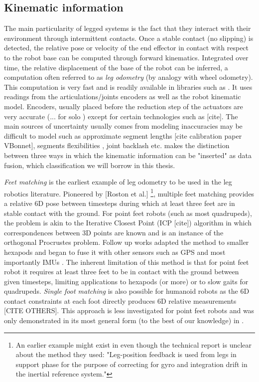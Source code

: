 \subsection{Kinematic information}
The main particularity of legged systems is the fact that they interact with their environment through intermittent contacts.
Once a stable contact (no slipping) is detected, the relative pose or velocity of the end effector in contact with respect to the robot base 
can be computed through forward kinematics. Integrated over time, the relative displacement of the base of the robot can be inferred, a computation 
often referred to as \textit{leg odometry} (by analogy with wheel odometry). This computation is very fast and is readily available in libraries such as \cite{carpentier2019pinocchio, hereid2017frost}. It uses
readings from the articulations/joints encoders as well as the robot kinematic model. Encoders, usually placed before the reduction step of the actuators
are very accurate (... for solo \cite{grimminger2020open}) except for certain technologies such as [cite]. The main sources of uncertainty usually comes from
modeling inaccuracies may be difficult to model such as approximate segment lengths [cite calibration paper VBonnet], segments flexibilities \cite{vigne2018estimation}, 
joint backlash \cite{fallon2014drift} etc. \cite{bloesch2018technical} makes the distinction between three ways in which the kinematic information can be "inserted" as data fusion, 
which classification we will borrow in this thesis. 


\textit{Feet matching} is the earliest example of leg odometry to be used in the leg robotics literature. Pioneered by [Roston et al.] 
\footnote{An earlier example might exist in \cite{roston1991dead} even though the technical report is unclear about the method they used: 
"Leg-position feedback is used from legs in support phase for the purpose of correcting for gyro and integration drift in the inertial reference system."},
multiple feet matching provides a relative 6D pose between timesteps during which at least three feet are in stable contact with the ground.
For point feet robots (such as most quadrupeds), the problem is akin to the Iterative Closest Point (ICP [cite]) algorithm in which correspondences between 3D points are known and is an instance of the orthogonal Procrustes problem.
Follow up works adapted the method to smaller hexapods \cite{lin2005leg} and began to fuse it with other sensors such as GPS \cite{gassmann2005localization, cobano2008location} 
and most importantly IMUs \cite{lin2006sensor, reinstein2011dead}.
The inherent limitation of this method is that for point feet robot it requires at least three feet to be in contact with the ground between given timesteps, limiting
applications to hexapods (or more) or to slow gaits for quadrupeds.
\textit{Single foot matching} is also possible for humanoid robots as the 6D contact constraints at each foot directly produces 6D 
relative measurements \cite{flayols2017experimental} [CITE OTHERS]. This approach is less investigated for point feet robots and was only 
demonstrated in its most general form (to the best of our knowledge) in \cite{fourmy2021contact}.

